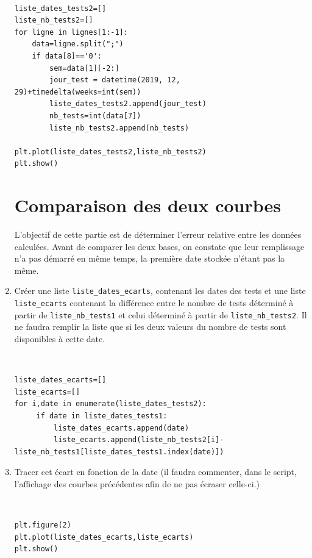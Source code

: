 \begin{enumerate}
\begin{solution}~\ \\
\begin{verbatim}
liste_dates_tests2=[]
liste_nb_tests2=[]
for ligne in lignes[1:-1]:
    data=ligne.split(";")
    if data[8]=='0':
        sem=data[1][-2:]
        jour_test = datetime(2019, 12, 29)+timedelta(weeks=int(sem))
        liste_dates_tests2.append(jour_test)
        nb_tests=int(data[7])
        liste_nb_tests2.append(nb_tests)

plt.plot(liste_dates_tests2,liste_nb_tests2)
plt.show()
\end{verbatim}
\end{solution}

\section*{Comparaison des deux courbes}

L'objectif de cette partie est de déterminer l'erreur relative entre les données calculées. Avant de comparer les deux bases, on constate que leur remplissage n'a pas démarré en même temps, la première date stockée n'étant pas la même.

\item Créer une liste \verb?liste_dates_ecarts?, contenant les dates des tests et une liste \verb?liste_ecarts? contenant la différence entre le nombre de tests déterminé à partir de \verb?liste_nb_tests1? et celui déterminé à partir de \verb?liste_nb_tests2?. Il ne faudra remplir la liste que si les deux valeurs du nombre de tests sont disponibles à cette date.

\begin{solution}~\ \\
\begin{verbatim}
liste_dates_ecarts=[]
liste_ecarts=[]
for i,date in enumerate(liste_dates_tests2):
     if date in liste_dates_tests1:
         liste_dates_ecarts.append(date)
         liste_ecarts.append(liste_nb_tests2[i]-liste_nb_tests1[liste_dates_tests1.index(date)])\end{verbatim}
\end{solution}

\item Tracer cet écart en fonction de la date (il faudra commenter, dans le script, l'affichage des courbes précédentes afin de ne pas écraser celle-ci.)

\begin{solution}~\ \\
\begin{verbatim}
plt.figure(2)
plt.plot(liste_dates_ecarts,liste_ecarts)
plt.show()
\end{verbatim}
\end{solution}


\end{enumerate}
